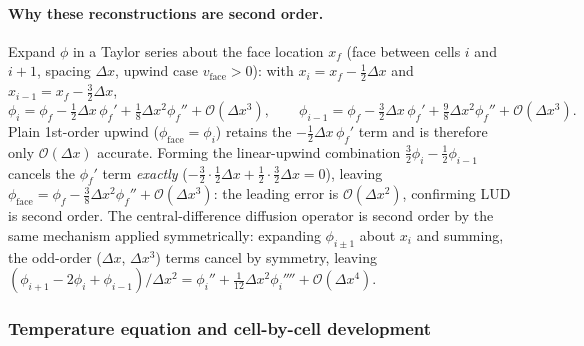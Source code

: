 \documentclass[12pt,a4paper]{article}
\begin{document}
\paragraph{Why these reconstructions are second order.} Expand $\phi$ in a Taylor series about
the face location $x_f$ (face between cells $i$ and $i{+}1$, spacing $\Delta x$, upwind case
$v_{\text{face}}>0$): with $x_i = x_f-\tfrac12\Delta x$ and $x_{i-1}=x_f-\tfrac32\Delta x$,
\begin{equation}
    \phi_i = \phi_f - \tfrac12\Delta x\,\phi_f' + \tfrac18\Delta x^2\phi_f'' + \mathcal{O}(\Delta x^3),
    \qquad
    \phi_{i-1} = \phi_f - \tfrac32\Delta x\,\phi_f' + \tfrac98\Delta x^2\phi_f'' + \mathcal{O}(\Delta x^3).
\end{equation}
Plain 1st-order upwind ($\phi_{\text{face}}=\phi_i$) retains the $-\tfrac12\Delta x\,\phi_f'$ term
and is therefore only $\mathcal{O}(\Delta x)$ accurate. Forming the linear-upwind combination
$\tfrac32\phi_i-\tfrac12\phi_{i-1}$ cancels the $\phi_f'$ term \emph{exactly}
($-\tfrac32\cdot\tfrac12\Delta x+\tfrac12\cdot\tfrac32\Delta x=0$), leaving
$\phi_{\text{face}}=\phi_f-\tfrac38\Delta x^2\phi_f''+\mathcal{O}(\Delta x^3)$: the leading error is
$\mathcal{O}(\Delta x^2)$, confirming LUD is second order. The central-difference diffusion
operator is second order by the same mechanism applied symmetrically: expanding $\phi_{i\pm1}$
about $x_i$ and summing, the odd-order ($\Delta x$, $\Delta x^3$) terms cancel by symmetry,
leaving $(\phi_{i+1}-2\phi_i+\phi_{i-1})/\Delta x^2 = \phi_i''+\tfrac{1}{12}\Delta x^2\phi_i''''+\mathcal{O}(\Delta x^4)$.

\subsubsection{Temperature equation and cell-by-cell development}
\end{document}
